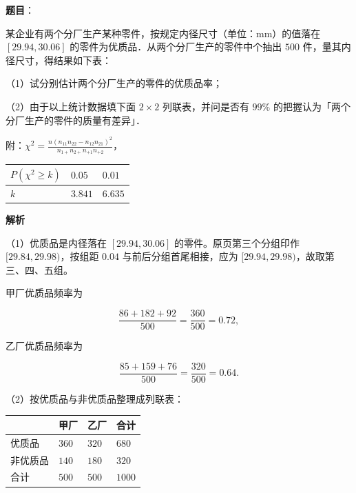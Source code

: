 \begin{answer}

\textbf{题目}：

某企业有两个分厂生产某种零件，按规定内径尺寸（单位：$\mathrm{mm}$）的值落在 $[29.94,30.06]$ 的零件为优质品．从两个分厂生产的零件中个抽出 $500$ 件，量其内径尺寸，得结果如下表：
\nopagebreak[4]
\begin{center}\end{center}
\nopagebreak[4]
（1）试分别估计两个分厂生产的零件的优质品率；

（2）由于以上统计数据填下面 $2\times2$ 列联表，并问是否有 $99\%$ 的把握认为「两个分厂生产的零件的质量有差异」．
\nopagebreak[4]
\begin{center}\end{center}
\nopagebreak[4]
附：$\chi^2=\frac{n(n_{11}n_{22}-n_{12}n_{21})^2}{n_{1+}n_{2+}n_{+1}n_{+2}}$，

\begin{center}
\begin{tabular}{lll}
\toprule
$P(\chi^2\geqslant k)$ & $0.05$ & $0.01$ \\
\midrule
$k$ & $3.841$ & $6.635$ \\
\bottomrule
\end{tabular}
\end{center}

\textbf{解析}

（1）优质品是内径落在 $[29.94,30.06]$ 的零件。原页第三个分组印作 $[29.84,29.98)$，按组距 $0.04$ 与前后分组首尾相接，应为 $[29.94,29.98)$，故取第三、四、五组。

甲厂优质品频率为

\nopagebreak[4]
\[\frac{86+182+92}{500}=\frac{360}{500}=0.72,\]

乙厂优质品频率为

\nopagebreak[4]
\[\frac{85+159+76}{500}=\frac{320}{500}=0.64 .\]

（2）按优质品与非优质品整理成列联表：

\begin{center}
\begin{tabular}{llll}
\toprule
 & 甲厂 & 乙厂 & 合计 \\
\midrule
优质品 & $360$ & $320$ & $680$ \\
非优质品 & $140$ & $180$ & $320$ \\
合计 & $500$ & $500$ & $1000$ \\
\bottomrule
\end{tabular}
\end{center}


\end{answer}
